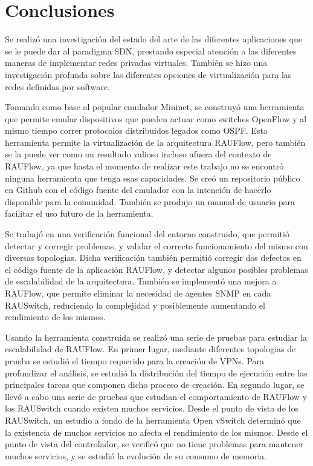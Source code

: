 \chapter{Conclusiones}

\graphicspath{{Chapter5/Figs/}}

Se realizó una investigación del estado del arte de las diferentes aplicaciones que se le puede dar al paradigma SDN, prestando especial atención a las diferentes maneras de implementar redes privadas virtuales. También se hizo una investigación profunda sobre las diferentes opciones de virtualización para las redes definidas por software.

Tomando como base al popular emulador Mininet, se construyó una herramienta que permite emular dispositivos que pueden actuar como switches OpenFlow y al mismo tiempo correr protocolos distribuidos legados como OSPF. Esta herramienta permite la virtualización de la arquitectura RAUFlow, pero también se la puede ver como un resultado valioso incluso afuera del contexto de RAUFlow, ya que hasta el momento de realizar este trabajo no se encontró ninguna herramienta que tenga esas capacidades. Se creó un repositorio público en Github \cite{gitp2015_44} con el código fuente del emulador con la intención de hacerlo disponible para la comunidad. También se produjo un manual de usuario para facilitar el uso futuro de la herramienta.

Se trabajó en una verificación funcional del entorno construido, que permitió detectar y corregir problemas, y validar el correcto funcionamiento del mismo con diversas topologias. Dicha verificación también permitió corregir dos defectos en el código fuente de la aplicación RAUFlow, y detectar algunos posibles problemas de escalabilidad de la arquitectura. También se implementó una mejora a RAUFlow, que permite eliminar la necesidad de agentes SNMP en cada RAUSwitch, reduciendo la complejidad y posiblemente aumentando el rendimiento de los mismos.

Usando la herramienta construida se realizó una serie de pruebas para estudiar la escalabilidad de RAUFlow. En primer lugar, mediante diferentes topologias de prueba se estudió el tiempo requerido para la creación de VPNs. Para profundizar el análisis, se estudió la distribución del tiempo de ejecución entre las principales tareas que componen dicho proceso de creación. En segundo lugar, se llevó a cabo una serie de pruebas que estudian el comportamiento de RAUFlow y los RAUSwitch cuando existen muchos servicios. Desde el punto de vista de los RAUSwitch, un estudio a fondo de la herramienta Open vSwitch determinó que la existencia de muchos servicios no afecta el rendimiento de los mismos. Desde el punto de vista del controlador, se verificó que no tiene problemas para mantener muchos servicios, y se estudió la evolución de su consumo de memoria.

